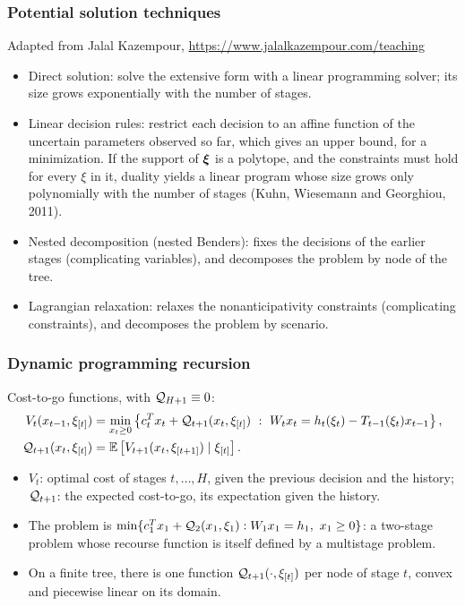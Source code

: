 \documentclass[aspectratio=169]{beamer}
\begin{document}
\begin{frame}
\frametitle{Potential solution techniques}

Adapted from Jalal Kazempour, \url{https://www.jalalkazempour.com/teaching}

\begin{itemize}
\item
{\red Direct solution}: solve the extensive form with a linear programming solver; its size grows exponentially with the number of stages.
\item
{\red Linear decision rules}: restrict each decision to an affine function of the uncertain parameters observed so far, which gives an upper bound, for a minimization.
If the support of ${\boldsymbol{\xi}}$ is a polytope, and the constraints must hold for every $\xi$ in it, duality yields a linear program whose size grows only polynomially with the number of stages (Kuhn, Wiesemann and Georghiou, 2011).
\item
{\red Nested decomposition} (nested Benders): fixes the decisions of the earlier stages (complicating variables), and decomposes the problem by node of the tree.
\item
{\red Lagrangian relaxation}: relaxes the nonanticipativity constraints (complicating constraints), and decomposes the problem by scenario.
\end{itemize}

\end{frame}

\begin{frame}
\frametitle{Dynamic programming recursion}

Cost-to-go functions, with ${\mathcal{Q}}_{H+1} \equiv 0$:
\begin{align*}
V_t(x_{t-1}, \xi_{[t]}) &= \min_{x_t \geq 0} \left\{ c_t^Tx_t + {\mathcal{Q}}_{t+1}(x_t, \xi_{[t]}) \ :\ W_t x_t = h_t(\xi_t) - T_{t-1}(\xi_t)x_{t-1} \right\}, \\
{\mathcal{Q}}_{t+1}(x_t, \xi_{[t]}) &= {\mathbb{E}}\left[ V_{t+1}(x_t, \xi_{[t+1]}) \mid \xi_{[t]} \right].
\end{align*}
\begin{itemize}
\item
$V_t$: optimal cost of stages $t, \ldots, H$, given the previous decision and the history; ${\mathcal{Q}}_{t+1}$: the {\red expected cost-to-go}, its expectation given the history.
\item
The problem is $\min \lbrace c_1^T x_1 + {\mathcal{Q}}_2(x_1, \xi_1) : W_1 x_1 = h_1,\ x_1 \geq 0 \rbrace$: a two-stage problem whose recourse function is itself defined by a multistage problem.
\item
On a finite tree, there is one function ${\mathcal{Q}}_{t+1}(\cdot, \xi_{[t]})$ per node of stage $t$, convex and piecewise linear on its domain.
\end{itemize}

\end{frame}
\end{document}
